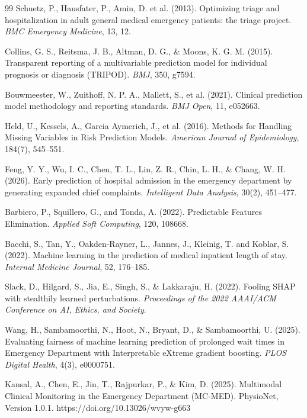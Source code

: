 \documentclass[harvard,article]{frontiersinFPHY_FAMS}
\begin{document}
\begin{thebibliography}{99}
 Schuetz, P., Hausfater, P., Amin, D. et al. (2013). Optimizing triage and hospitalization in adult general medical emergency patients: the triage project. \textit{BMC Emergency Medicine}, 13, 12.

 Collins, G. S., Reitsma, J. B., Altman, D. G., \& Moons, K. G. M. (2015). Transparent reporting of a multivariable prediction model for individual prognosis or diagnosis (TRIPOD). \textit{BMJ}, 350, g7594.

 Bouwmeester, W., Zuithoff, N. P. A., Mallett, S., et al. (2021). Clinical prediction model methodology and reporting standards. \textit{BMJ Open}, 11, e052663.

 Held, U., Kessels, A., Garcia Aymerich, J., et al. (2016). Methods for Handling Missing Variables in Risk Prediction Models. \textit{American Journal of Epidemiology}, 184(7), 545--551.

 Feng, Y. Y., Wu, I. C., Chen, T. L., Lin, Z. R., Chin, L. H., \& Chang, W. H. (2026). Early prediction of hospital admission in the emergency department by generating expanded chief complaints. \textit{Intelligent Data Analysis}, 30(2), 451--477.

 Barbiero, P., Squillero, G., and Tonda, A. (2022). Predictable Features Elimination. \textit{Applied Soft Computing}, 120, 108668.

 Bacchi, S., Tan, Y., Oakden-Rayner, L., Jannes, J., Kleinig, T. and Koblar, S. (2022). Machine learning in the prediction of medical inpatient length of stay. \textit{Internal Medicine Journal}, 52, 176--185.

 Slack, D., Hilgard, S., Jia, E., Singh, S., \& Lakkaraju, H. (2022). Fooling SHAP with stealthily learned perturbations. \textit{Proceedings of the 2022 AAAI/ACM Conference on AI, Ethics, and Society}.

 Wang, H., Sambamoorthi, N., Hoot, N., Bryant, D., \& Sambamoorthi, U. (2025). Evaluating fairness of machine learning prediction of prolonged wait times in Emergency Department with Interpretable eXtreme gradient boosting. \textit{PLOS Digital Health}, 4(3), e0000751.

 Kansal, A., Chen, E., Jin, T., Rajpurkar, P., \& Kim, D. (2025). Multimodal Clinical Monitoring in the Emergency Department (MC-MED). PhysioNet, Version 1.0.1. https://doi.org/10.13026/wvyw-g663


\end{thebibliography}
\end{document}
